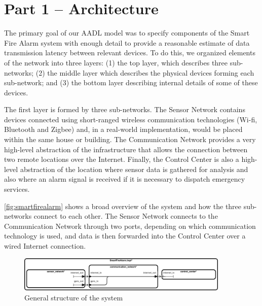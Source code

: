 \section{Part 1 -- Architecture}


The primary goal of our AADL model was to specify components of the Smart Fire Alarm system with enough detail to provide a reasonable estimate of data transmission latency between relevant devices. To do this, we organized elements of the network into three layers: (1) the top layer, which describes three sub-networks; (2) the middle layer which describes the physical devices forming each sub-network; and (3) the bottom layer describing internal details of some of these devices.

The first layer is formed by three sub-networks. The Sensor Network contains devices connected using short-ranged wireless communication technologies (Wi-fi, Bluetooth and Zigbee) and, in a real-world implementation, would be placed within the same house or building. The Communication Network provides a very high-level abstraction of the infrastructure that allows the connection between two remote locations over the Internet. Finally, the Control Center is also a high-level abstraction of the location where sensor data is gathered for analysis and also where an alarm signal is received if it is necessary to dispatch emergency services.

\autoref{fig:smartfirealarm} shows a broad overview of the system and how the three sub-networks connect to each other. The Sensor Network connects to the Communication Network through two ports, depending on which communication technology is used, and data is then forwarded into the Control Center over a wired Internet connection.


\begin{figure}[h]
\caption{General structure of the system}
\label{fig:smartfirealarm}
\centering
\includegraphics[width=0.9\textwidth]{SmartFireAlarm}
\end{figure}

